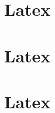 \section{Latex}\label{latexscripte}

\section{Latex}\label{latexscripte}

\section{Latex}\label{latexscripte}

